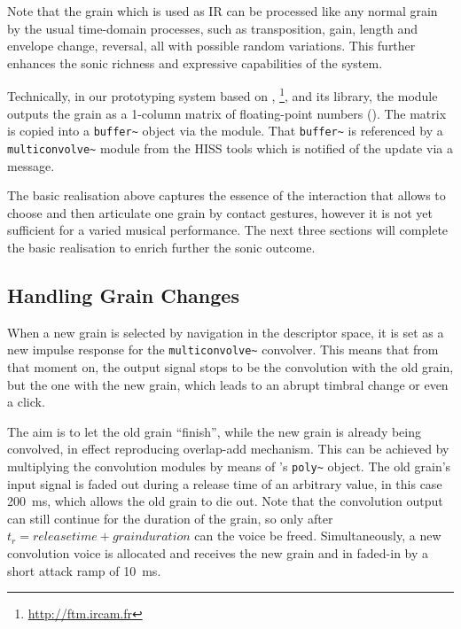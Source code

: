 Note that the grain which is used as IR can be processed like any normal grain by the usual time-domain processes, such as transposition, gain, length and envelope change, reversal, all with possible random variations. This further enhances the sonic richness and expressive capabilities of the system.

Technically, in our prototyping system based on , \footnote{\url{http://ftm.ircam.fr}}, and its   library, the  module outputs the grain as a 1-column matrix of floating-point numbers ().  The matrix is copied into a \verb|buffer~| object via the  module.
That \verb|buffer~| is referenced by a \verb|multiconvolve~| module from the HISS tools which is notified of the update via a message.


The basic realisation above captures the essence of the interaction that allows to choose and then articulate one grain by contact gestures, however it is not yet sufficient for a varied musical performance.  The next three sections will complete the basic realisation to enrich further the sonic outcome.


\subsection{Handling Grain Changes}\label{sec:set}

When a new grain is selected by navigation in the descriptor space, it is set as a new impulse response for the \verb|multiconvolve~| convolver.  This means that from that moment on, the output signal stops to be the convolution with the old grain, but the one with the new grain, which leads to an abrupt timbral change or even a click.

The aim is to let the old grain ``finish'', while the new grain is already being convolved, in effect reproducing overlap-add mechanism.  This can be achieved by multiplying the convolution modules by means of \maxmsp's \verb|poly~| object.  The old grain's input signal is faded out during a release time of an arbitrary value, in this case 200~ms, which allows the old grain to die out.  Note that the convolution output can still continue for the duration of the grain, so only after $t_r = release time + grain duration$ can the voice be freed.  Simultaneously, a new convolution voice is allocated and receives the new grain and in faded-in by a short attack ramp of 10~ms.


